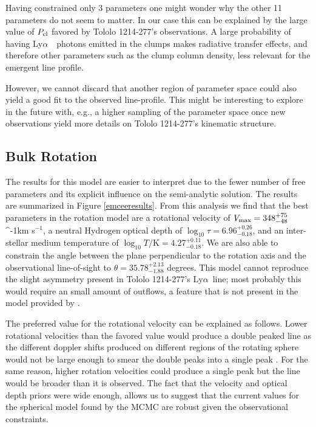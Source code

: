 \documentclass[a4paper,fleqn,usenatbib]{mnras}
\newcommand{\tol}{Tololo 1214-277}
\newcommand{\lya}{\ifmmode{{\rm Ly}\alpha}\else Ly$\alpha$\ \fi}
\newcommand{\kms}{\ifmmode\mathrm{km\ s}^{-1}\else km s$^{-1}$\fi}
\begin{document}
Having constrained only 3 parameters one might wonder why the other 11
parameters do not seem to matter.
In our case this can be explained by the large value of $P_{\rm cl}$
favored by \tol's observations. 
A large probability of having \lya\ photons emitted in the clumps
makes radiative transfer effects, and therefore other parameters such
as the clump column density, less relevant for the emergent line
profile. 


However, we cannot discard that another region of parameter space
could also yield a good fit to the observed line-profile.
This might be interesting to explore in the
future with, e.g., a higher sampling of the parameter space once new 
observations  yield more details on \tol's kinematic structure. 

\subsection{Bulk Rotation}

The results for this model are easier to interpret due to the fewer
number of free parameters and its explicit influence on the
semi-analytic solution.
The results are summarized in  Figure \ref{emceeresults}. 
From this analysis we find that the best parameters in the rotation
model are a rotational velocity of  $V_{\rm max}=348^{+75}_{-48}$
\kms, a neutral Hydrogen optical depth of
$\log_{10}\tau=6.96^{+0.26}_{-0.18}$,  and an inter-stellar medium
temperature of $\log_{10} T/\mathrm {K} = 4.27^{+0.11}_{-0.18}$.   
We are also able to constrain the angle between the plane
perpendicular to the rotation axis and the observational line-of-sight
to $\theta = 35.78^{+2.13}_{-1.88}$ degrees.
This model cannot reproduce the slight asymmetry present in \tol's
\lya line; most probably this would require an small amount of
outflows, a feature that is not present in the model provided by
\cite{GaravitoCamargo2014}. 

The preferred value for the rotational velocity can be explained as
follows. 
Lower rotational velocities than the favored value would produce a
double peaked line as the different doppler shifts produced on
different regions of the rotating sphere would not be large enough to
smear the double peaks into a single peak
\citep{GaravitoCamargo2014}. 
For the same reason, higher rotation velocities could produce a single
peak but the line would be broader than it is observed.
The fact that the velocity and optical depth priors were wide enough,
allows us to suggest that the current values for the spherical model
found by the MCMC are robust given the observational constraints.
\end{document}

